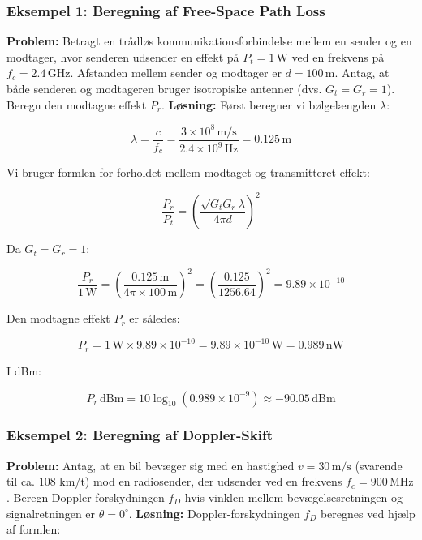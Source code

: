 \documentclass[a4paper,12pt]{book}
\begin{document}
	\subsubsection{Eksempel 1: Beregning af Free-Space Path Loss}
	\textbf{Problem:} Betragt en trådløs kommunikationsforbindelse mellem en sender og en modtager, hvor senderen udsender en effekt på \( P_t = 1 \, \text{W} \) ved en frekvens på \( f_c = 2.4 \, \text{GHz} \). Afstanden mellem sender og modtager er \( d = 100 \, \text{m} \). Antag, at både senderen og modtageren bruger isotropiske antenner (dvs. \( G_t = G_r = 1 \)). Beregn den modtagne effekt \( P_r \).
	\newline\newline
	\noindent\textbf{Løsning:}
	\noindent
	Først beregner vi bølgelængden \( \lambda \):
	
	\[
	\lambda = \frac{c}{f_c} = \frac{3 \times 10^8 \, \text{m/s}}{2.4 \times 10^9 \, \text{Hz}} = 0.125 \, \text{m}
	\]
	
	\noindent Vi bruger formlen for forholdet mellem modtaget og transmitteret effekt:
	
	\[
	\frac{P_r}{P_t} = \left( \frac{\sqrt{G_t G_r} \lambda}{4\pi d} \right)^2
	\]
	
	\noindent Da \( G_t = G_r = 1 \):
	
	\[
	\frac{P_r}{1 \, \text{W}} = \left( \frac{0.125 \, \text{m}}{4\pi \times 100 \, \text{m}} \right)^2 = \left( \frac{0.125}{1256.64} \right)^2 = 9.89 \times 10^{-10}
	\]
	
	\noindent Den modtagne effekt \( P_r \) er således:
	
	\[
	P_r = 1 \, \text{W} \times 9.89 \times 10^{-10} = 9.89 \times 10^{-10} \, \text{W} = 0.989 \, \text{nW}
	\]
	
	\noindent I dBm:
	
	\[
	P_r \, \text{dBm} = 10 \log_{10} \left( 0.989 \times 10^{-9} \right) \approx -90.05 \, \text{dBm}
	\]
	
	\subsubsection{Eksempel 2: Beregning af Doppler-Skift}
	\textbf{Problem:} Antag, at en bil bevæger sig med en hastighed \( v = 30 \, \text{m/s} \) (svarende til ca. 108 km/t) mod en radiosender, der udsender ved en frekvens \( f_c = 900 \, \text{MHz} \). Beregn Doppler-forskydningen \( f_D \) hvis vinklen mellem bevægelsesretningen og signalretningen er \( \theta = 0^\circ \).
	\newline\newline\noindent
	\textbf{Løsning:}
	\noindent
	Doppler-forskydningen \( f_D \) beregnes ved hjælp af formlen:
	
\end{document}
